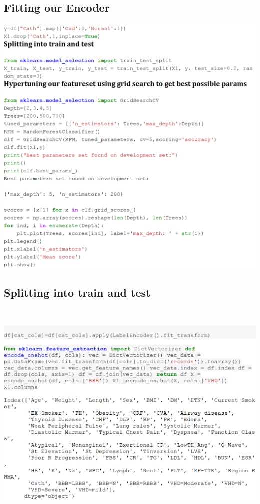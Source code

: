 \documentclass[sigconf]{acmart}
\begin{document}
\subsection{Fitting our Encoder}

\includegraphics[width=0.95\columnwidth]{project/images/Untitled5.png}

\subsection{Splitting into train and test}\

\includegraphics[width=0.95\columnwidth]{project/images/Untitled4.png}
\end{document}
